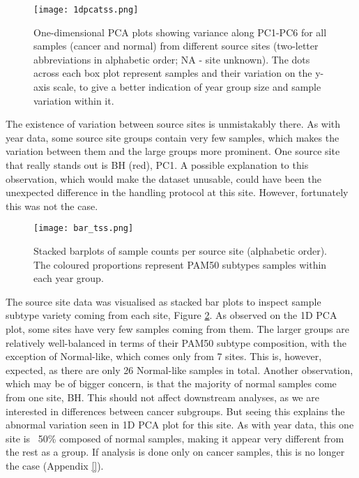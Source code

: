            
            \begin{figure}[!h]
            \centering
            \texttt{[image: 1dpcatss.png]}
            \caption{One-dimensional PCA plots showing variance along PC1-PC6 for all samples (cancer and normal) from different source sites (two-letter abbreviations in alphabetic order; NA - site unknown). The dots across each box plot represent samples and their variation on the y-axis scale, to give a better indication of year group size and sample variation within it.}
            \label{fig:1dpcatss}
            \end{figure}
            
            
    \newpage
    The existence of variation between source sites is unmistakably there. As with year data, some source site groups contain very few samples, which makes the variation between them and the large groups more prominent. One source site that really stands out is BH (red), PC1. A possible explanation to this observation, which would make the dataset unusable, could have been the unexpected difference in the handling protocol at this site. However, fortunately this was not the case.  \\
    
            \begin{figure}[!h]
            \centering
            \texttt{[image: bar\_tss.png]}
            \caption{Stacked barplots of sample counts per source site (alphabetic order). The coloured proportions represent PAM50 subtypes samples within each year group. }
            \label{fig:bartss}
            \end{figure}
    
    The source site data was visualised as stacked bar plots to inspect sample subtype variety coming from each site, Figure \ref{fig:bartss}. As observed on the 1D PCA plot, some sites have very few samples coming from them. The larger groups are relatively well-balanced in terms of their PAM50 subtype composition, with the exception of Normal-like, which comes only from 7 sites. This is, however, expected, as there are only 26 Normal-like samples in total. Another observation, which may be of bigger concern, is that the majority of normal samples come from one site, BH. This should not affect downstream analyses, as we are interested in differences between cancer subgroups. But seeing this explains the abnormal variation seen in 1D PCA plot for this site. As with year data, this one site is ~50\% composed of normal samples, making it appear very different from the rest as a group. If analysis is done only on cancer samples, this is no longer the case (Appendix \ref{}). 
    
